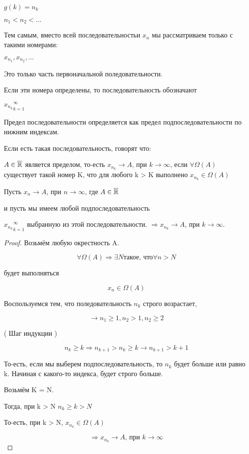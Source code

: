 $g(k) = n_k$

$n_1 < n_2 < \dots $

Тем самым, вместо всей последовательностьи $x_n$ мы рассматриваем только с такими номерами:

$x_{n_1}, x_{n_2}, \dots$

Это только часть первоначальной поледовательности.

\begin{notation}
    Если эти номера определены, то последовательность обозначают

    ${x_{n_k}}_{k=1}^\infty$


\end{notation}

Предел последовательности определяется как предел подпоследовательности по нижним индексам.

Если есть такая последовательность, говорят что:

$ A \in \overline{\mathbb{R}} $ является пределом, то-есть $x_{n_k} \to A$, при $k \to \infty$, если $\forall \Omega (A)$ существует такой номер K, что для любого k > K выполнено $x_{n_k} \in \Omega (A)$


\begin {theorem}

Пусть $x_n \to A$, при $n \to \infty$, где $A \in \overline {\mathbb{R}}$

и пусть мы имеем любой подпоследовательность

${x_{n_k}}_{k=1}^\infty$ выбранную из этой последовательности. $\Rightarrow x_{n_k} \to A$, при $k \to \infty$.



\end{theorem}

\begin{proof}
    Возьмём любую окрестность A.

    \[ \forall \Omega (A) \Rightarrow \exists N \text{такое, что} \forall n > N \]

    будет выполняться

    \[ x_n \in \Omega (A) \]

    Воспользуемся тем, что поледовательность $n_k$ строго возрастает,

    \[ \rightarrow n_1 \geq 1, n_2 > 1, n_2 \geq 2 \]

    ( Шаг индукции )

    \[n_k \geq k \Rightarrow n_{k + 1} > n_k \geq k \rightarrow n_{k + 1} > k+1\]

    То-есть, если мы выберем подпоследовательность, то $n_k$ будет больше или равно k. Начиная с какого-то индекса, будет строго больше.

    Возьмём K = N.

    Тогда, при k > N $n_k \geq k > N$

    То-есть, при k > N, $x_{n_k} \in \Omega (A)$

    \[\Rightarrow x_{n_k} \to A \text{, при $k \to \infty$} \]
\end{proof}


